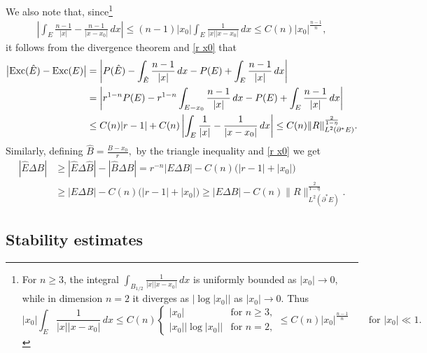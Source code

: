 \documentclass[reqno,11pt]{amsart}
\numberwithin{equation}{section}
\theoremstyle{remark}
\begin{document}
We also note that, since\footnote{For $n\geq 3$, the integral $\int_{B_{1/2}} \frac{1}{|x||x-x_0|}\,dx$ is uniformly bounded as $|x_0| \to 0$, while in dimension $n=2$ it diverges as $\big|\log|x_0|\big|$ as $|x_0|\to 0$. Thus
$$
|x_0|\int_{E} \frac{1}{|x||x-x_0|}\, dx \leq C(n)\left\{
\begin{array}{cl}
|x_0| & \text{for $n \geq 3$},\\
|x_0|\big|\log|x_0|\big| & \text{for $n =2$},
\end{array}
\right.
\leq C(n)|x_0|^{\frac{n-1}{n}} \qquad \text{for $|x_0|\ll 1$}.
$$
}
\begin{align*}
  \left|\int_{E} \frac{n-1}{|x|} - \frac{n-1}{|x-x_0|}\, dx\right| 
\le (n-1)|x_0|\int_{E} \frac{1}{|x||x-x_0|}\, dx \leq C(n)|x_0|^{\frac{n-1}{n}},
\end{align*}
it follows from the divergence theorem and \eqref{r x0} that
\begin{align}
\big|{\rm Exc}(\hat E)-{\rm Exc}(E)\big|&= \bigg| P(\hat E)- \int_{\hat E} \frac{n-1}{|x|}\, dx -P(E)+\int_{E} \frac{n-1}{|x|}\, dx\bigg|\nonumber\\
&=\bigg| r^{1-n}P(E)-r^{1-n} \int_{E-x_0} \frac{n-1}{|x|}\, dx -P(E)+\int_{E} \frac{n-1}{|x|}\, dx\bigg|  \nonumber\\
&\leq C(n)|r-1|+ C(n) \left|\int_{E} \frac{1}{|x|} - \frac{1}{|x-x_0|}\, dx\right|\leq C(n)\| R\|^{\frac 2{1-\eta}}_{L^2(\partial^*E)}. \label{difference 1}
\end{align}
Similarly, defining $\hat B=\frac{B-x_0}{r},$ by the triangle inequality and \eqref{r x0} we get
\begin{align}
|\hat E\Delta B| &\ge  |\hat E\Delta \hat B|  - |\hat B\Delta B|= r^{-n}|E\Delta B|  - C(n)\big(|r-1|+|x_0|\big) \nonumber\\
 &\ge  |E\Delta B|  - C(n)\big(|r-1|+|x_0|\big) \geq |E\Delta B| -C(n)\| R\|^{\frac 2{1-\eta}}_{L^2(\partial^*E)}. \label{difference 2}
\end{align}

 
 

 \subsection{Stability estimates}
 
\end{document}
